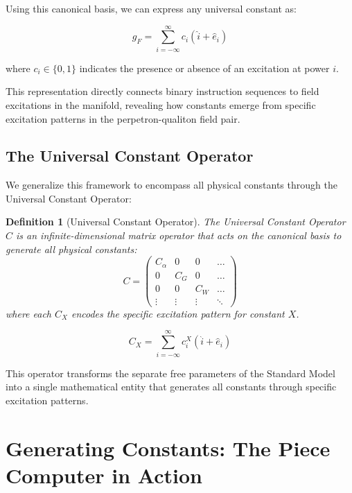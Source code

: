 \documentclass{article}
\newtheorem{definition}{Definition}
\begin{document}
Using this canonical basis, we can express any universal constant as:

\begin{equation}
g_F = \sum_{i=-\infty}^{\infty} c_i (\hat{i} + \hat{e}_i)
\end{equation}

where $c_i \in \{0, 1\}$ indicates the presence or absence of an excitation at power $i$.

This representation directly connects binary instruction sequences to field excitations in the manifold, revealing how constants emerge from specific excitation patterns in the perpetron-qualiton field pair.

\subsection{The Universal Constant Operator}

We generalize this framework to encompass all physical constants through the Universal Constant Operator:

\begin{definition}[Universal Constant Operator]
The Universal Constant Operator $C$ is an infinite-dimensional matrix operator that acts on the canonical basis to generate all physical constants:
\begin{equation}
C = \begin{pmatrix}
C_\alpha & 0 & 0 & \ldots \\
0 & C_G & 0 & \ldots \\
0 & 0 & C_W & \ldots \\
\vdots & \vdots & \vdots & \ddots
\end{pmatrix}
\end{equation}
where each $C_X$ encodes the specific excitation pattern for constant $X$.
\end{definition}

\begin{equation}
C_X = \sum_{i=-\infty}^{\infty} c_i^X (\hat{i} + \hat{e}_i)
\end{equation}

This operator transforms the separate free parameters of the Standard Model into a single mathematical entity that generates all constants through specific excitation patterns.

\section{Generating Constants: The Piece Computer in Action}
\end{document}

